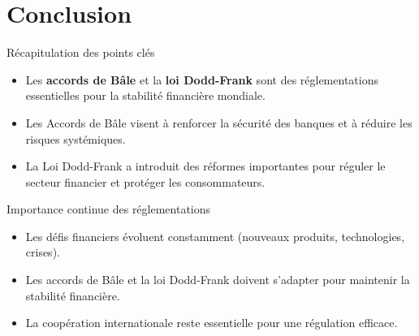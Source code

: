 \section{Conclusion}

\begin{frame}{Récapitulation des points clés}
    \begin{itemize}
        \item Les \textbf{accords de Bâle} et la \textbf{loi Dodd-Frank} sont des réglementations essentielles pour la stabilité financière mondiale.
        \item Les Accords de Bâle visent à renforcer la sécurité des banques et à réduire les risques systémiques.
        \item La Loi Dodd-Frank a introduit des réformes importantes pour réguler le secteur financier et protéger les consommateurs.
    \end{itemize}
\end{frame}

\begin{frame}{Importance continue des réglementations}
    \begin{itemize}
        \item Les défis financiers évoluent constamment (nouveaux produits, technologies, crises).
        \item Les accords de Bâle et la loi Dodd-Frank doivent s'adapter pour maintenir la stabilité financière.
        \item La coopération internationale reste essentielle pour une régulation efficace.
    \end{itemize}
\end{frame}